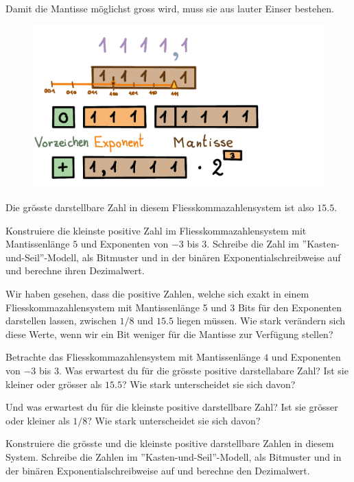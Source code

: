\begin{beispiel}
Damit die Mantisse möglichst gross wird, muss sie aus lauter Einser bestehen.
\begin{figure}[H]
\centering
\includegraphics[width=0.85\linewidth]{Pictures/groessteZahl3.png}
\end{figure}

Die grösste darstellbare Zahl in diesem Fliesskommazahlensystem ist also \(15.5\).
\end{beispiel}

\begin{aufgabe}\label{kleinsteZahl-5-3}
Konstruiere die kleinste positive Zahl im Fliesskommazahlensystem mit Mantissenlänge \(5\) und Exponenten von \(-3\) bis \(3\). Schreibe die Zahl im ''Kasten-und-Seil''-Modell, als Bitmuster und in der binären Exponentialschreibweise auf und berechne ihren Dezimalwert.
\end{aufgabe}

Wir haben gesehen, dass die positive Zahlen, welche sich exakt in einem Fliesskommazahlensystem mit Mantissenlänge 5 und 3 Bits für den Exponenten darstellen lassen, zwischen \(1/8\) und \(15.5\) liegen müssen. Wie stark verändern sich diese Werte, wenn wir ein Bit weniger für die Mantisse zur Verfügung stellen?

\begin{aufgabe}\label{groesste-kleinste-4-3}
Betrachte das Fliesskommazahlensystem mit Mantissenlänge \(4\) und Exponenten von \(-3\) bis \(3\). Was erwartest du für die grösste positive darstellabare Zahl? Ist sie kleiner oder grösser als \(15.5\)? Wie stark unterscheidet sie sich davon?

Und was erwartest du für die kleinste positive darstellbare Zahl? Ist sie grösser oder kleiner als \(1/8\)? Wie stark unterscheidet sie sich davon?

Konstruiere die grösste und die kleinste positive darstellbare Zahlen in diesem System.  Schreibe die Zahlen im ''Kasten-und-Seil''-Modell, als Bitmuster und in der binären Exponentialschreibweise auf und berechne den Dezimalwert. 
\end{aufgabe}

